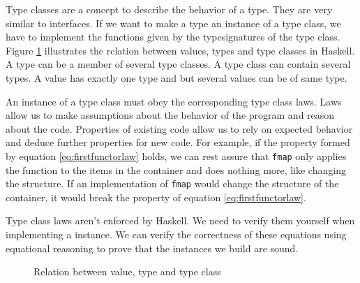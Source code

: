Type classes are a concept to describe the behavior of a type. 
They are very similar to interfaces. If we want to make a type an instance of a type class, we have to implement the functions given by the \glspl{typesignature} of the type class. Figure \ref{fig:typeclassrelation} illustrates the relation between values, types and type classes in Haskell. A type can be a member of several type classes. A type class can contain several types. A value has exactly one type and but several values can be of same type.

An instance of a type class must obey the corresponding type class laws. Laws allow us to make assumptions about the behavior of the program and reason about the code. Properties of existing code allow us to rely on expected behavior and deduce further properties for new code. For example, if the property formed by equation \ref{eq:firstfunctorlaw} holds, we can rest assure that \verb|fmap| only applies the function to the items in the container and does nothing more, like changing the structure. If an implementation of \verb|fmap| would change the structure of the container, it would break the property of equation \ref{eq:firstfunctorlaw}.

Type class laws aren't enforced by Haskell. We need to verify them yourself when implementing a instance. We can verify the correctness of these equations using equational reasoning to prove that the instances we build are sound. 


\begin{figure}
\centering
{}
\caption{Relation between value, type and type class}
\label{fig:typeclassrelation}
\end{figure}
